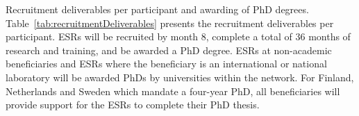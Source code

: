 



\noindent \color{blue}Recruitment deliverables per participant and awarding of PhD degrees. \color{black}
Table~\ref{tab:recruitmentDeliverables} presents the recruitment deliverables per participant. 
ESRs will be recruited by month 8, complete
a total of 36 months of research and training, and be awarded a PhD degree. 
ESRs at non-academic beneficiaries and ESRs where
the beneficiary is an international or national laboratory will 
be awarded PhDs by universities within the network. 
For Finland, Netherlands and Sweden which mandate a
four-year PhD, all beneficiaries will provide support
for the ESRs to complete their PhD thesis.

